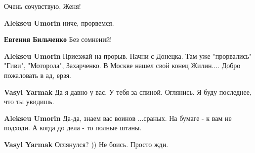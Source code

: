 \begin{itemize}
Очень сочувствую, Женя!

\begin{itemize}
 
\textbf{Alekseu Umorin} ниче, прорвемся.

 
\textbf{Евгения Бильченко}
Без сомнений!

 
\textbf{Alekseu Umorin} Приезжай на прорыв. Начни с Донецка. Там уже "прорвались" "Гиви", "Моторола", Захарченко.
В Москве нашел свой конец Жилин.... Добро пожаловать в ад, ерзя. \Smiley[1.0][yellow]

 
\textbf{Vasyl Yarmak}
Да я давно у вас. У тебя за спиной. Оглянись.
Я буду последнее, что ты увидишь.

 
\textbf{Alekseu Umorin} Да-да, знаем вас воинов ...сраных.
На бумаге - к вам не подходи. А когда до дела - то полные штаны.

 
\textbf{Vasyl Yarmak}
Оглянулся? ))
Не боись. Просто жди.

 

\end{itemize}
\end{itemize}
